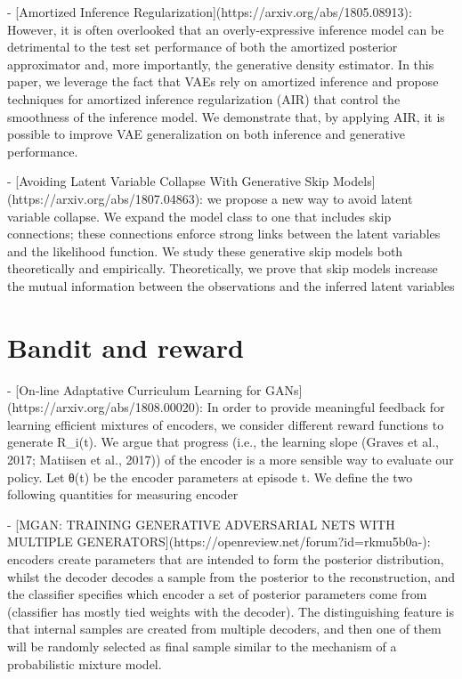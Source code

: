 \documentclass[aps,preprint,showpacs,superscriptaddress,groupedaddress]{revtex4}  %
\begin{document}
-  [Amortized Inference Regularization](https://arxiv.org/abs/1805.08913): However, it is often overlooked that an overly-expressive inference model can be detrimental to the test set performance of both the amortized posterior approximator and, more importantly, the generative density estimator. In this paper, we leverage the fact that VAEs rely on amortized inference and propose techniques for amortized inference regularization (AIR) that control the smoothness of the inference model. We demonstrate that, by applying AIR, it is possible to improve VAE generalization on both inference and generative performance.

- [Avoiding Latent Variable Collapse With Generative Skip Models](https://arxiv.org/abs/1807.04863):  we propose a new way to avoid latent variable collapse. We expand the model class to one that includes skip connections; these connections enforce strong links between the latent variables and the likelihood function. We study these generative skip models both theoretically and empirically. Theoretically, we prove that skip models increase the mutual information between the observations and the inferred latent variables

\section{Bandit and reward}


- [On-line Adaptative Curriculum Learning for GANs](https://arxiv.org/abs/1808.00020): In order to provide meaningful feedback for learning efficient mixtures of encoders, we consider different reward functions to generate R_i(t). We argue that progress (i.e., the learning slope (Graves et al., 2017; Matiisen et al., 2017)) of the encoder is a more sensible way to evaluate our policy. Let θ(t) be the encoder parameters at episode t. We define the two following quantities for measuring encoder


- [MGAN: TRAINING GENERATIVE ADVERSARIAL NETS WITH MULTIPLE GENERATORS](https://openreview.net/forum?id=rkmu5b0a-): encoders create parameters that are intended to form the posterior distribution, whilst the decoder decodes a sample from the posterior to the reconstruction, and the classifier specifies which encoder a set of posterior parameters come from (classifier has mostly tied weights with the decoder). The distinguishing feature is that internal samples are created from multiple decoders, and then one of them will be randomly selected as final sample similar to the mechanism of a probabilistic mixture model.
\end{document}
